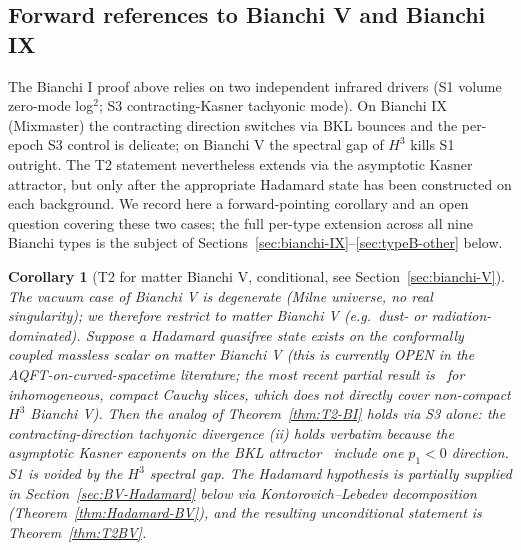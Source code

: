 \documentclass[11pt]{article}
\newtheorem{corollary}[theorem]{Corollary}
\theoremstyle{definition}
\begin{document}
\subsection{Forward references to Bianchi V and Bianchi IX}\label{sec:T2-coverage}

The Bianchi I proof above relies on two independent infrared drivers (S1 volume zero-mode log$^2$; S3 contracting-Kasner tachyonic mode). On Bianchi IX (Mixmaster) the contracting direction switches via BKL bounces and the per-epoch S3 control is delicate; on Bianchi V the spectral gap of $H^3$ kills S1 outright. The T2 statement nevertheless extends via the asymptotic Kasner attractor, but only after the appropriate Hadamard state has been constructed on each background. We record here a forward-pointing corollary and an open question covering these two cases; the full per-type extension across all nine Bianchi types is the subject of Sections~\ref{sec:bianchi-IX}--\ref{sec:typeB-other} below.

\begin{corollary}[T2 for matter Bianchi V, conditional, see Section~\ref{sec:bianchi-V}]\label{cor:T2-BV}
The vacuum case of Bianchi V is degenerate (Milne universe, no real singularity); we therefore restrict to matter Bianchi V (e.g.\ dust- or radiation-dominated). Suppose a Hadamard quasifree state exists on the conformally coupled massless scalar on matter Bianchi V (this is currently OPEN in the AQFT-on-curved-spacetime literature; the most recent partial result is~\cite{BrumThem2013} for inhomogeneous, compact Cauchy slices, which does not directly cover non-compact $H^3$ Bianchi V). Then the analog of Theorem~\ref{thm:T2-BI} holds via S3 alone: the contracting-direction tachyonic divergence (ii) holds verbatim because the asymptotic Kasner exponents on the BKL attractor~\cite{WainwrightEllis1997} include one $p_1<0$ direction. S1 is voided by the $H^3$ spectral gap. The Hadamard hypothesis is partially supplied in Section~\ref{sec:BV-Hadamard} below via Kontorovich--Lebedev decomposition (Theorem~\ref{thm:Hadamard-BV}), and the resulting unconditional statement is Theorem~\ref{thm:T2BV}.
\end{corollary}
\end{document}
